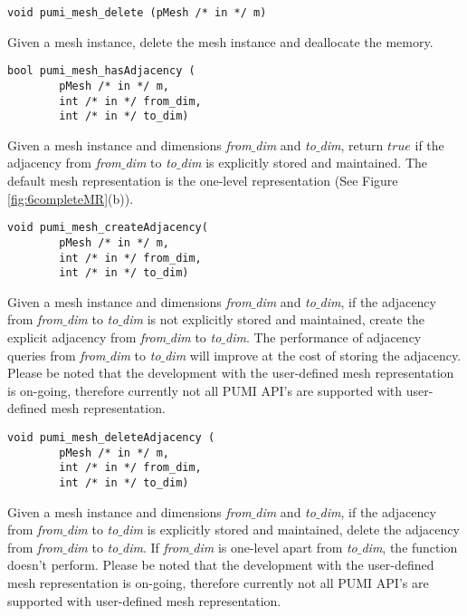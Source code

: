 \begin{verbatim}	
void pumi_mesh_delete (pMesh /* in */ m)
\end{verbatim}\vspace{-.5cm}\hspace{1cm}	
Given a mesh instance, delete the mesh instance and deallocate the memory.

\begin{verbatim}	
bool pumi_mesh_hasAdjacency (
        pMesh /* in */ m,
        int /* in */ from_dim, 
        int /* in */ to_dim)
\end{verbatim}\vspace{-.5cm}\hspace{1cm}	
Given a mesh instance and dimensions \emph{from$\_$dim} and \emph{to$\_$dim}, return $true$ if the adjacency from \emph{from$\_$dim} to \emph{to$\_$dim} is explicitly stored and maintained. The default mesh representation is the one-level representation (See Figure \ref{fig:6completeMR}(b)).

\begin{verbatim}	
void pumi_mesh_createAdjacency( 
        pMesh /* in */ m,
        int /* in */ from_dim, 
        int /* in */ to_dim)
\end{verbatim}\vspace{-.5cm}\hspace{1cm}	
Given a mesh instance and  dimensions \emph{from$\_$dim} and \emph{to$\_$dim}, if the adjacency from \emph{from$\_$dim} to \emph{to$\_$dim} is not explicitly stored and maintained, create the explicit adjacency from \emph{from$\_$dim} to \emph{to$\_$dim}. The performance of adjacency queries from \emph{from$\_$dim} to \emph{to$\_$dim} will improve at the cost of storing the adjacency. Please be noted that the development with the user-defined mesh representation is on-going, therefore currently not all PUMI API's are supported with user-defined mesh representation. 

\begin{verbatim}	
void pumi_mesh_deleteAdjacency (
        pMesh /* in */ m,
        int /* in */ from_dim, 
        int /* in */ to_dim)
\end{verbatim}\vspace{-.5cm}\hspace{1cm}	
Given a mesh instance and  dimensions \emph{from$\_$dim} and \emph{to$\_$dim}, if the adjacency from \emph{from$\_$dim} to \emph{to$\_$dim} is explicitly stored and maintained, delete the adjacency from \emph{from$\_$dim} to \emph{to$\_$dim}. If \emph{from$\_$dim} is one-level apart from \emph{to$\_$dim}, the function doesn't perform. Please be noted that the development with the user-defined mesh representation is on-going, therefore currently not all PUMI API's are supported with user-defined mesh representation. 

